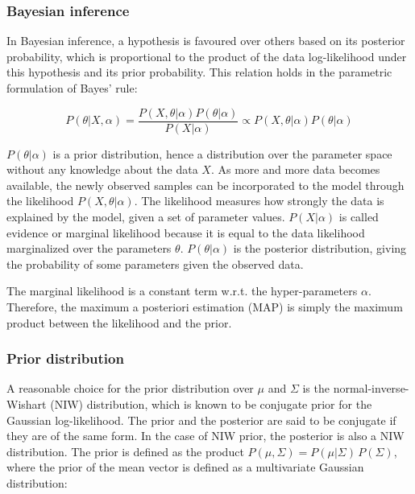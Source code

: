         \subsubsection{Bayesian inference}

            In Bayesian inference, a hypothesis is favoured over others based on its posterior probability,
            which is proportional to the product of the data log-likelihood under this hypothesis
            and its prior probability. This relation holds in the parametric formulation of Bayes' rule:
            
            \begin{equation}
                P(\theta \vert X, \alpha) = \frac{P(X, \theta \vert \alpha) P(\theta \vert \alpha)}{P(X \vert \alpha)} \propto 
                P(X, \theta \vert \alpha) P(\theta \vert \alpha)
            \end{equation}

            $P(\theta \vert \alpha)$ is a prior distribution, hence a distribution over the parameter space without
            any knowledge about the data $X$. As more and more data becomes available, the newly observed samples can be
            incorporated to the model through the likelihood $P(X, \theta \vert \alpha)$. The likelihood measures how strongly
            the data is explained by the model, given a set of parameter values. $P(X \vert \alpha)$ is called evidence or
            marginal likelihood because it is equal to the data likelihood marginalized over the parameters $\theta$.
            $P(\theta \vert \alpha)$ is the posterior distribution, giving the probability of some parameters given
            the observed data. 

            The marginal likelihood is a constant term w.r.t. the hyper-parameters $\alpha$. Therefore, the maximum
            a posteriori estimation (MAP) is simply the maximum product between the likelihood and the prior.

        \subsubsection{Prior distribution}

            A reasonable choice for the prior distribution over $\mu$ and $\Sigma$ is the normal-inverse-Wishart (NIW)
            distribution, which is known to be conjugate prior for the Gaussian log-likelihood.
            The prior and the posterior are said to be conjugate if they are of the same form. In the case of NIW prior,
            the posterior is also a NIW distribution. The prior is defined as the product
            $P(\mu, \Sigma) = P(\mu \vert \Sigma)\,P(\Sigma)$, where the prior of the mean vector is defined as a multivariate
            Gaussian distribution:

